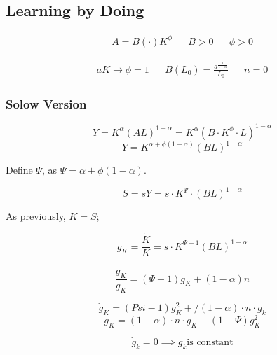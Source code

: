 \subsection{Learning by Doing}

\begin{align*}
    A=B(\cdot)K^{\phi} && B>0 && \phi>0
\end{align*}

\begin{align*}
    aK \to \phi=1 && B(L_{0})=\frac{a^{\frac{1}{1-\alpha}}}{L_{0}} && n=0
\end{align*}

\subsubsection{Solow Version}

\begin{equation*}
    Y=K^\alpha(AL)^{1-\alpha}=K^{\alpha}(B\cdot K^{\phi}\cdot L)^{1-\alpha}
\end{equation*}
\begin{equation*}
    Y=K^{\alpha+\phi(1-\alpha)}(BL)^{1-\alpha}   
\end{equation*}
 
Define $\Psi$, as $\Psi=\alpha+\phi(1-\alpha)$. 
 
\begin{equation*}
    S=sY=s\cdot K^\Psi\cdot(BL)^{1-\alpha}
\end{equation*}

As previously, $\Dot{K}=S$; 

\begin{equation*}
    g_{K}=\frac{\Dot{K}}{K}=s\cdot K^{\Psi-1}(BL)^{1-\alpha}
\end{equation*}

\begin{equation*}
    \frac{\Dot{g}_{K}}{g_{K}}=(\Psi-1)g_{K}+(1-\alpha)n
\end{equation*}

\begin{equation*}
    \Dot{g}_{K}=(Psi-1)g_{K}^2+/(1-\alpha)\cdot n \cdot g_{k}
\end{equation*}
\begin{equation*}
    \Dot{g}_{K}=(1-\alpha)\cdot n \cdot g_{K}-(1-\Psi)g_{K}^2
\end{equation*}

\begin{equation*}
    \Dot{g}_{k}=0 \implies g_{k} \text{is constant}
\end{equation*}

